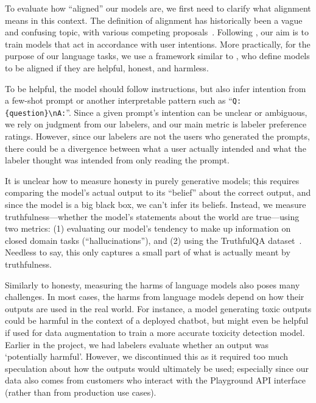 \documentclass{article}
\begin{document}
To evaluate how ``aligned'' our models are, we first need to clarify what alignment means in this context. The definition of alignment has historically been a vague and confusing topic, with various competing proposals~\citep{chen2021evaluating,leike2018scalable,gabriel2020artificial}. Following \citet{leike2018scalable}, our aim is to train models that act in accordance with user intentions. More practically, for the purpose of our language tasks, we use a framework similar to \citet{askell2021general}, who define models to be aligned if they are helpful, honest, and harmless.

To be helpful, the model should follow instructions, but also infer intention from a few-shot prompt or another interpretable pattern such as ``\texttt{Q: \{question\}\textbackslash nA:}''. Since a given prompt's intention can be unclear or ambiguous, we rely on judgment from our labelers, and our main metric is labeler preference ratings. However, since our labelers are not the users who generated the prompts, there could be a divergence between what a user actually intended and what the labeler thought was intended from only reading the prompt.

It is unclear how to measure honesty in purely generative models; this requires comparing the model's actual output to its ``belief'' about the correct output, and since the model is a big black box, we can't infer its beliefs. Instead, we measure truthfulness---whether the model's statements about the world are true---using two metrics: (1) evaluating our model's tendency to make up information on closed domain tasks (``hallucinations''), and (2) using the TruthfulQA dataset~\citep{lin2021truthfulqa}. Needless to say, this only captures a small part of what is actually meant by truthfulness.

Similarly to honesty, measuring the harms of language models also poses many challenges. In most cases, the harms from language models depend on how their outputs are used in the real world. For instance, a model generating toxic outputs could be harmful in the context of a deployed chatbot, but might even be helpful if used for data augmentation to train a more accurate toxicity detection model. Earlier in the project, we had labelers evaluate whether an output was ‘potentially harmful'. However, we discontinued this as it required too much speculation about how the outputs would ultimately be used; especially since our data also comes from customers who interact with the Playground API interface (rather than from production use cases).
\end{document}
